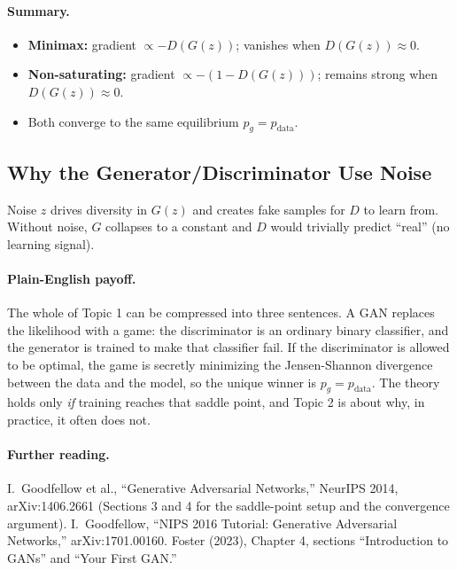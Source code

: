 \documentclass[11pt]{article}
\theoremstyle{remark}
\begin{document}
\paragraph{Summary.}
\begin{itemize}
  \item \textbf{Minimax:} gradient $\propto -D(G(z))$; vanishes when $D(G(z))\approx 0$.
  \item \textbf{Non-saturating:} gradient $\propto -(1-D(G(z)))$; remains strong
        when $D(G(z))\approx 0$.
  \item Both converge to the same equilibrium $p_g=p_{\text{data}}$.
\end{itemize}

\subsection{Why the Generator/Discriminator Use Noise}
Noise $z$ drives diversity in $G(z)$ and creates fake samples for $D$ to learn from. Without noise, $G$ collapses to a constant and $D$ would trivially predict ``real'' (no learning signal).

\paragraph{Plain-English payoff.}
The whole of Topic 1 can be compressed into three sentences. A GAN replaces the likelihood with a game: the discriminator is an ordinary binary classifier, and the generator is trained to make that classifier fail. If the discriminator is allowed to be optimal, the game is secretly minimizing the Jensen-Shannon divergence between the data and the model, so the unique winner is $p_g=p_{\text{data}}$. The theory holds only \emph{if} training reaches that saddle point, and Topic 2 is about why, in practice, it often does not.

\paragraph{Further reading.}\begingroup\sloppy
I.\ Goodfellow et al., ``Generative Adversarial Networks,'' NeurIPS 2014, arXiv:1406.2661 (Sections 3 and 4 for the saddle-point setup and the convergence argument). I.\ Goodfellow, ``NIPS 2016 Tutorial: Generative Adversarial Networks,'' arXiv:1701.00160. Foster (2023), Chapter 4, sections ``Introduction to GANs'' and ``Your First GAN.''
\endgroup

\end{document}
